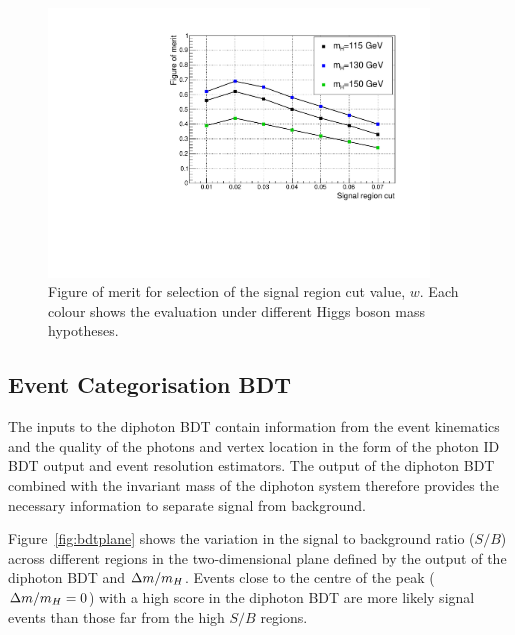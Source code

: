 \begin{figure}
 \begin{center}
  \includegraphics[width=0.9\textwidth]{hgg7TeV/sidebandMvaPlots/fom.pdf}
 \end{center}
  \caption{Figure of merit for selection of the signal region cut value, $w$. Each colour shows the evaluation
  under different Higgs boson mass hypotheses.}
  \label{fig:sigwindowopt}
\end{figure}


\subsection{Event Categorisation BDT}
\label{sec:bdteventdiscriminator}

The inputs to the diphoton BDT contain information from the event kinematics and the quality of the photons 
and vertex location in the form of the photon ID BDT output and event resolution estimators. 
The output of the diphoton BDT combined with the invariant mass of the diphoton system therefore provides 
the necessary information to separate signal from background.

Figure~\ref{fig:bdtplane} 
shows the variation in the signal to background ratio ($S/B$) across different regions in the 
two-dimensional plane defined by the output of the diphoton BDT and $\Delta m/m_{H}$.
Events close to the centre of the peak ($\Delta m/m_{H}=0$) with a high score in the diphoton BDT are more
likely signal events than those far from the high $S/B$ regions.

